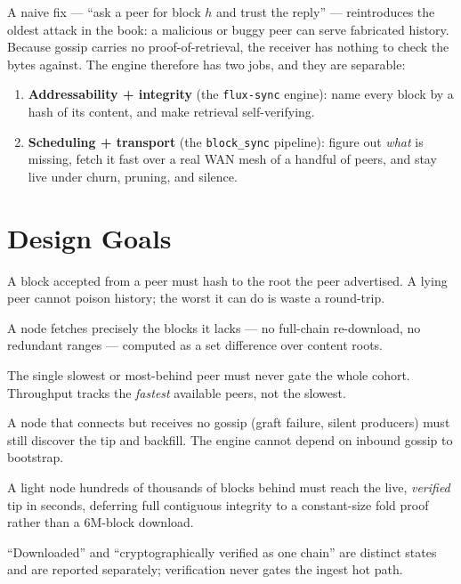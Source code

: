 \documentclass[11pt,a4paper]{article}
\begin{document}
A naive fix --- ``ask a peer for block $h$ and trust the reply'' --- reintroduces
the oldest attack in the book: a malicious or buggy peer can serve fabricated
history. Because gossip carries no proof-of-retrieval, the receiver has nothing
to check the bytes against. The engine therefore has two jobs, and they are
separable:

\begin{enumerate}[leftmargin=2em]
  \item \textbf{Addressability + integrity} (the \texttt{flux-sync} engine):
        name every block by a hash of its content, and make retrieval
        self-verifying.
  \item \textbf{Scheduling + transport} (the \texttt{block\_sync} pipeline):
        figure out \emph{what} is missing, fetch it fast over a real WAN mesh of
        a handful of peers, and stay live under churn, pruning, and silence.
\end{enumerate}

\section{Design Goals}

\begin{description}[leftmargin=1.5em,style=nextline]
  \item[G1 --- Verify-don't-trust.] A block accepted from a peer must hash to the
        root the peer advertised. A lying peer cannot poison history; the worst
        it can do is waste a round-trip.
  \item[G2 --- Exact backfill.] A node fetches precisely the blocks it lacks ---
        no full-chain re-download, no redundant ranges --- computed as a set
        difference over content roots.
  \item[G3 --- No barrier stalls.] The single slowest or most-behind peer must
        never gate the whole cohort. Throughput tracks the \emph{fastest}
        available peers, not the slowest.
  \item[G4 --- Liveness without gossip.] A node that connects but receives no
        gossip (graft failure, silent producers) must still discover the tip and
        backfill. The engine cannot depend on inbound gossip to bootstrap.
  \item[G5 --- Monitor-fast.] A light node hundreds of thousands of blocks behind
        must reach the live, \emph{verified} tip in seconds, deferring full
        contiguous integrity to a constant-size fold proof rather than a 6M-block
        download.
  \item[G6 --- Honest watermarks.] ``Downloaded'' and ``cryptographically
        verified as one chain'' are distinct states and are reported separately;
        verification never gates the ingest hot path.
\end{description}
\end{document}
